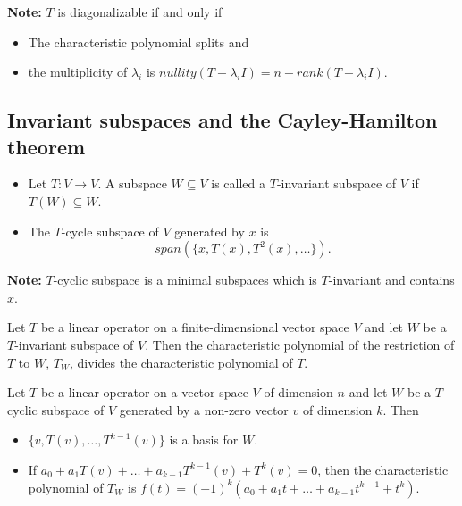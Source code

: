 \documentclass[12pt]{article}
\newenvironment{theorem}[2][Theorem]{\begin{trivlist}
\item[\hskip \labelsep {\bfseries #1}\hskip \labelsep {\bfseries #2.}]}{\end{trivlist}}
\newenvironment{definition}[2][Definition]{\begin{trivlist}
\item[\hskip \labelsep {\bfseries #1}\hskip \labelsep {\bfseries #2}]}{\end{trivlist}}
\begin{document}
\noindent \textbf{Note:} $T$ is diagonalizable if and only if 
\begin{itemize}
    \item The characteristic polynomial splits and
    \item the multiplicity of $\lambda_i$ is $nullity(T - \lambda_iI) = n - rank(T - \lambda_iI)$.
\end{itemize}

\setcounter{subsection}{3}

\subsection{Invariant subspaces and the Cayley-Hamilton theorem}

\begin{definition}{6} \text{ }
\begin{itemize}
    \item Let $T : V \to V$. A subspace $W \subseteq V$ is called a $T$-invariant subspace of $V$ if $T(W) \subseteq W$.
    
    \item The $T$-cycle subspace of $V$ generated by $x$ is $$span(\{x, T(x), T^2(x), \dots\}).$$
\end{itemize}
\end{definition}

\textbf{Note:} $T$-cyclic subspace is a minimal subspaces which is $T$-invariant and contains $x$.

\begin{theorem}{5.21}
Let $T$ be a linear operator on a finite-dimensional vector space $V$ and let $W$ be a $T$-invariant subspace of $V$. Then the characteristic polynomial of the restriction of $T$ to $W$, $T_W$, divides the characteristic polynomial of $T$. 
\end{theorem}

\begin{theorem}{5.22}
Let $T$ be a linear operator on a vector space $V$ of dimension $n$ and let $W$ be a $T$-cyclic subspace of $V$ generated by a non-zero vector $v$ of dimension $k$. Then

\begin{itemize}
    \item[(a)] $\{v, T(v), \dots, T^{k - 1}(v)\}$ is a basis for $W$. 
    
    \item[(b)] If $a_0 + a_1T(v) + \dots + a_{k-1}T^{k-1}(v) + T^k(v) = 0$, then the characteristic polynomial of $T_W$ is $f(t) = (-1)^k(a_0 + a_1t + \dots + a_{k-1}t^{k-1} + t^k)$.
\end{itemize}
\end{theorem}
\end{document}

